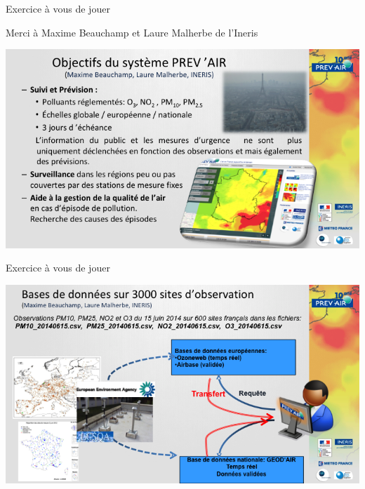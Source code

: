 \documentclass[8pt,ignorenonframetext,]{beamer}
\begin{document}
\begin{frame}{Exercice à vous de jouer}

\begin{block}{Merci à Maxime Beauchamp et Laure Malherbe de l'Ineris}

\begin{center}
  \includegraphics[width=1\textwidth]{figINERIS1.png}
\end{center}

\end{block}

\end{frame}

\begin{frame}{Exercice à vous de jouer}

\begin{center}
  \includegraphics[width=1\textwidth]{figINERIS3.png}
\end{center}

\end{frame}
\end{document}
